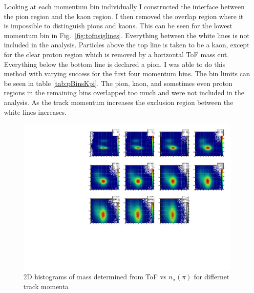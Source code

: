 \documentclass[letterpaper, abstract = on,listof=totoc, bibliography=totoc]{scrreprt}
\begin{document}
Looking at each momentum bin individually I constructed the interface between the pion region and the kaon region. I then removed the overlap region where it is impossible to distinguish pions and kaons. This can be seen for the lowest momentum bin in Fig.~\ref{fig:tofnsiglines}. Everything between the white lines is not included in the analysis. Particles above the top line is taken to be a kaon, except for the clear proton region which is removed by a horizontal ToF mass cut. Everything below the bottom line is declared a pion. I was able to do this method with varying success for the first four momentum bins. The bin limits can be seen in table \ref{tab:pBinsKpi}. The pion, kaon, and sometimes even proton regions in the remaining bins overlapped too much and were not included in the analysis. As the track momentum increases the exclusion region between the white lines increases.    
\begin{figure}
\begin{center}
\includegraphics[width = 1\textwidth]{TofNSigmaPiPbins_new}
\caption[2D histograms of mass vs $n_\sigma(\pi)$ for differnet track momenta]{2D histograms of mass determined from ToF vs $n_\sigma(\pi)$ for differnet track momenta}
\label{fig:tofNSigma}
\end{center}
\end{figure}
\end{document}
